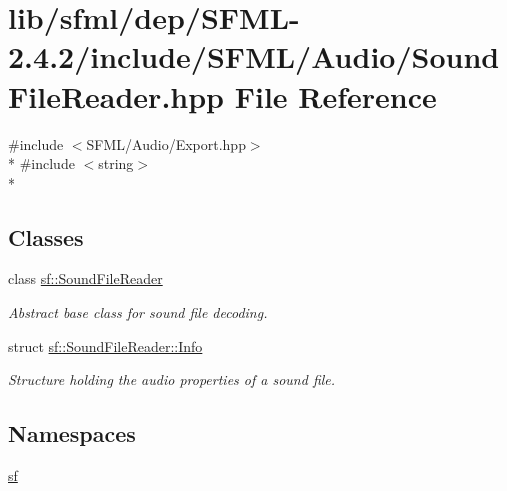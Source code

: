 \hypertarget{sfml_2dep_2_s_f_m_l-2_84_82_2include_2_s_f_m_l_2_audio_2_sound_file_reader_8hpp}{\section{lib/sfml/dep/\-S\-F\-M\-L-\/2.4.2/include/\-S\-F\-M\-L/\-Audio/\-Sound\-File\-Reader.hpp File Reference}
\label{sfml_2dep_2_s_f_m_l-2_84_82_2include_2_s_f_m_l_2_audio_2_sound_file_reader_8hpp}
}
{\ttfamily \#include $<$S\-F\-M\-L/\-Audio/\-Export.\-hpp$>$}\\*
{\ttfamily \#include $<$string$>$}\\*
\subsection*{Classes}
\begin{DoxyCompactItemize}
\item 
class \hyperlink{classsf_1_1_sound_file_reader}{sf\-::\-Sound\-File\-Reader}
\begin{DoxyCompactList}\small\item\em Abstract base class for sound file decoding. \end{DoxyCompactList}\item 
struct \hyperlink{structsf_1_1_sound_file_reader_1_1_info}{sf\-::\-Sound\-File\-Reader\-::\-Info}
\begin{DoxyCompactList}\small\item\em Structure holding the audio properties of a sound file. \end{DoxyCompactList}\end{DoxyCompactItemize}
\subsection*{Namespaces}
\begin{DoxyCompactItemize}
\item 
\hyperlink{namespacesf}{sf}
\end{DoxyCompactItemize}
